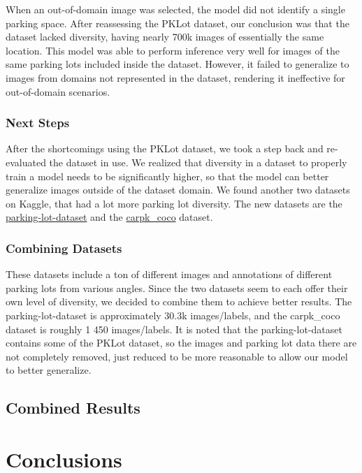 \documentclass[12pt, letterpaper, oneside]{article}
\begin{document}
When an out-of-domain image was selected, the model did not identify a single parking space. After reassessing the PKLot dataset, our conclusion was that the dataset lacked diversity, having nearly 700k images of essentially the same location. This model was able to perform inference very well for images of the same parking lots included inside the dataset. However, it failed to generalize to images from domains not represented in the dataset, rendering it ineffective for out-of-domain scenarios.

\subsubsection{Next Steps}

After the shortcomings using the PKLot dataset, we took a step back and re-evaluated the dataset in use. We realized that diversity in a dataset to properly train a model needs to be significantly higher, so that the model can better generalize images outside of the dataset domain. We found another two datasets on Kaggle, that had a lot more parking lot diversity. The new datasets are the \href{https://www.kaggle.com/datasets/muhwira/parking-lot-dataset}{parking-lot-dataset} and the \href{https://www.kaggle.com/datasets/trainingdatapro/parking-space-detection-dataset}{carpk\_coco} dataset. 

\subsubsection{Combining Datasets}
These datasets include a ton of different images and annotations of different parking lots from various angles. Since the two datasets seem to each offer their own level of diversity, we decided to combine them to achieve better results. The parking-lot-dataset is approximately 30.3k images/labels, and the carpk\_coco dataset is roughly 1 450 images/labels. It is noted that the parking-lot-dataset contains some of the PKLot dataset, so the images and parking lot data there are not completely removed, just reduced to be more reasonable to allow our model to better generalize.

\subsection{Combined Results}


\section{Conclusions}
\label{sec:conc}
\end{document}
